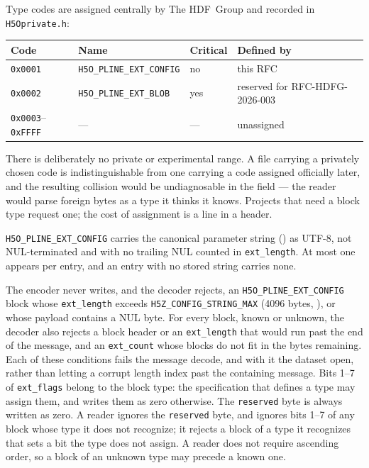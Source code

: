 \documentclass[../RFC-HDFG-2026-001.tex]{subfiles}
\begin{document}

Type codes are assigned centrally by The HDF~Group and recorded in
\texttt{H5Oprivate.h}:

\begin{center}
\begin{tabular}{llll}
\toprule
\textbf{Code} & \textbf{Name} & \textbf{Critical} & \textbf{Defined by} \\
\midrule
\texttt{0x0001} & \texttt{H5O\_PLINE\_EXT\_CONFIG} & no  & this RFC \\
\texttt{0x0002} & \texttt{H5O\_PLINE\_EXT\_BLOB}   & yes & reserved for RFC-HDFG-2026-003 \\
\texttt{0x0003}--\texttt{0xFFFF} & --- & --- & unassigned \\
\bottomrule
\end{tabular}
\end{center}

There is deliberately no private or experimental range.  A file carrying a
privately chosen code is indistinguishable from one carrying a code
assigned officially later, and the resulting collision would be
undiagnosable in the field --- the reader would parse foreign bytes as a
type it thinks it knows.  Projects that need a block type request one; the
cost of assignment is a line in a header.

\texttt{H5O\_PLINE\_EXT\_CONFIG} carries the canonical parameter string
() as
UTF-8, not NUL-terminated and with no trailing NUL counted in
\texttt{ext\_length}.  At most one appears per entry, and an entry with no
stored string carries none.


The encoder never writes, and the decoder rejects, an
\texttt{H5O\_PLINE\_EXT\_CONFIG} block whose \texttt{ext\_length} exceeds
\texttt{H5Z\_CONFIG\_STRING\_MAX} (4096 bytes,
), or whose payload contains a NUL byte.  For every block, known or unknown, the
decoder also rejects a block header or an \texttt{ext\_length} that would
run past the end of the message, and an \texttt{ext\_count} whose blocks do
not fit in the bytes remaining.  Each of these conditions fails the message
decode, and with it the dataset open, rather than letting a corrupt length
index past the containing message.  Bits 1--7 of \texttt{ext\_flags}
belong to the block type: the specification that defines a type may
assign them, and writes them as zero otherwise.  The \texttt{reserved}
byte is always written as zero.  A reader ignores the \texttt{reserved}
byte, and ignores bits 1--7 of any block whose type it does not
recognize; it rejects a block of a type it recognizes that sets a bit the
type does not assign.  A reader does not require ascending order, so a
block of an unknown type may precede a known one.
\end{document}

